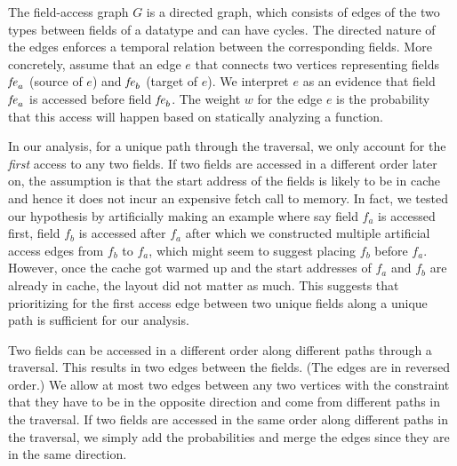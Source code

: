  
The field-access graph $G$ is a directed graph, which consists of edges of the two types between fields of a datatype and can have cycles. The directed nature of the edges enforces a temporal relation between the corresponding fields. More concretely, assume that an edge $e$ that connects two vertices representing fields $\mathit{fe}_{a}$ (source of $e$) and $\mathit{fe}_{b}$ (target of $e$). We interpret $e$ as an evidence that field $\mathit{fe}_{a}$ is accessed before field $\mathit{fe}_{b}$. The weight $w$ for the edge $e$ is the probability that this access will happen based on statically analyzing a function. %

In our analysis, for a unique path through the traversal, we only account for the {\em first} access to any two fields. If two fields are accessed in a different order later on, the assumption is that the start address of the fields is likely to be in cache and hence it does not incur an expensive fetch call to memory. In fact, we tested our hypothesis by artificially making an example where say field $f_{a}$ is accessed first, field $f_{b}$ is accessed after $f_{a}$ after which we constructed multiple artificial access edges from $f_{b}$ to $f_{a}$, which might seem to suggest placing $f_{b}$ before $f_{a}$. However, once the cache got warmed up and the start addresses of $f_{a}$ and $f_{b}$ are already in cache, the layout did not matter as much. This suggests that prioritizing for the first access edge between two unique fields along a unique path is sufficient for our analysis.

Two fields can be accessed in a different order along different paths through a traversal. This results in two edges between the fields. (The edges are in reversed order.) We allow at most two edges between any two vertices with the constraint that they have to be in the opposite direction and come from different paths in the traversal. If two fields are accessed in the same order along different paths in the traversal, we simply add the probabilities and merge the edges since they are in the same direction.

